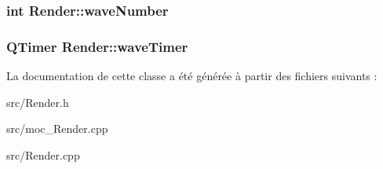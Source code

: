 \label{classRender_a6b5e2349a706152d4763d22b995e9237}
\hypertarget{classRender_a682e96907f3d52f710df4e9c2a5e9d07}{
\subsubsection[{waveNumber}]{\setlength{\rightskip}{0pt plus 5cm}int {\bf Render::waveNumber}}}
\label{classRender_a682e96907f3d52f710df4e9c2a5e9d07}
\hypertarget{classRender_a6351bb3de99ef093995785788c1d218e}{
\subsubsection[{waveTimer}]{\setlength{\rightskip}{0pt plus 5cm}QTimer {\bf Render::waveTimer}}}
\label{classRender_a6351bb3de99ef093995785788c1d218e}


La documentation de cette classe a été générée à partir des fichiers suivants :\begin{DoxyCompactItemize}
\item 
src/Render.h\item 
src/moc\_\-Render.cpp\item 
src/Render.cpp\end{DoxyCompactItemize}
